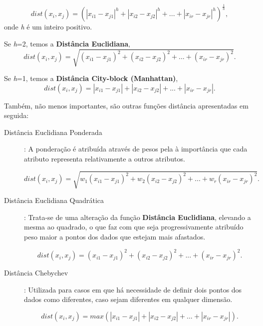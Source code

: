 \begin{equation}
dist(x_{i}, x_{j}) = (|x_{i1} - x_{j1}|^h + |x_{i2} - x_{j2}|^h +...+ |x_{ir} - x_{jr}|^h)^\frac{1}{h},
\end{equation}
onde \textit{h} é um inteiro positivo.

Se \textit{h}=2, temos a \textbf{Distância Euclidiana},
\begin{equation} 
dist(x_{i}, x_{j}) = \sqrt{(x_{i1} - x_{j1})^2 + (x_{i2} - x_{j2})^2 +...+ (x_{ir} - x_{jr})^2}.
\label{eq: euclid}
\end{equation}

Se \textit{h}=1, temos a \textbf{Distância City-block (Manhattan)},
\begin{equation}
dist(x_{i}, x_{j}) = |x_{i1} - x_{j1}| + |x_{i2} - x_{j2}| +...+ |x_{ir} - x_{jr}|.
\end{equation}

Também, não menos importantes, são outras funções distância apresentadas em seguida:

\begin{description}
\item[Distância Euclidiana Ponderada]: A ponderação é atribuída através de pesos pela à importância que cada atributo representa relativamente a outros atributos.

\begin{equation}
dist(x_{i}, x_{j}) = \sqrt{w_{1}(x_{i1} - x_{j1})^2 + w_{2}(x_{i2} - x_{j2})^2 +...+ w_{r}(x_{ir} - x_{jr})^2}.
\end{equation} 

\item[Distância Euclidiana Quadrática]: Trata-se de uma alteração da função \textbf{Distância Euclidiana}, elevando a mesma ao quadrado, o que faz com que seja progressivamente atribuído peso maior a pontos dos dados que estejam mais afastados.

\begin{equation}
dist(x_{i}, x_{j}) = (x_{i1} - x_{j1})^2 + (x_{i2} - x_{j2})^2 +...+ (x_{ir} - x_{jr})^2.
\end{equation}

\item[Distância Chebychev]: Utilizada para casos em que há necessidade de definir dois pontos dos dados como diferentes, caso sejam diferentes em qualquer dimensão.

\begin{equation}
dist(x_{i}, x_{j}) = max(|x_{i1} - x_{j1}| + |x_{i2} - x_{j2}| +...+ |x_{ir} - x_{jr}|).
\end{equation}

\end{description}

